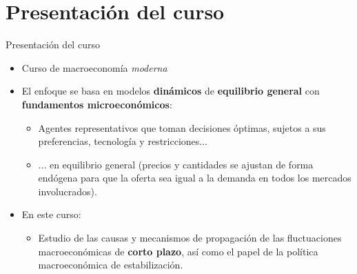 \documentclass[aspectratio=169,11pt]{beamer}
\newcommand{\cidehighlight}[1]{\textcolor{CIDEBlue}{\bfseries #1}}
\begin{document}
\section{Presentación del curso}

\begin{frame}{Presentación del curso}
  \begin{itemize}
    \item Curso de macroeconomía \textit{moderna}
    \item El enfoque se basa en modelos \cidehighlight{dinámicos} de \cidehighlight{equilibrio general} con \cidehighlight{fundamentos microeconómicos}:
    \begin{itemize}
      \item Agentes representativos que toman decisiones óptimas, sujetos a sus preferencias, tecnología y restricciones...
      \item ... en equilibrio general (precios y cantidades se ajustan de forma endógena para que la oferta sea igual a la demanda en todos los mercados involucrados).
    \end{itemize}
    \item En este curso: 
    \begin{itemize}
      \item Estudio de las causas y mecanismos de propagación de las fluctuaciones macroeconómicas de \cidehighlight{corto plazo}, así como el papel de la política macroeconómica de estabilización.
    \end{itemize}
  \end{itemize}
\end{frame}
\end{document}
